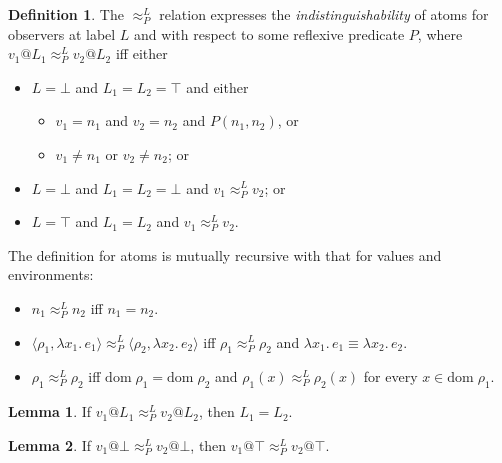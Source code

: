 \documentclass{article}
\makeatletter
\newcommand{\at}{\ensuremath{{\scriptstyle{@}}}}
\theoremstyle{definition}
\newtheorem{lemma}{Lemma}
\newtheorem{definition}{Definition}
\makeatother
\begin{document}
\begin{definition}
  The $\approx^{L}_{P}$ relation expresses the \emph{indistinguishability} of
  atoms for observers at label $L$ and with respect to some reflexive predicate
  $P$, where $v_1 \at L_1 \approx^{L}_{P} v_2 \at L_2$ iff either
  \begin{itemize}
  \item $L = \bot$ and
    $L_1 = L_2 = \top$ and either
    \begin{itemize}
    \item $v_1 = n_1$ and
      $v_2 = n_2$ and
      $P(n_1, n_2)$, or
    \item $v_1 \not= n_1$ or $v_2 \not= n_2$; or
    \end{itemize}
  \item $L = \bot$ and
    $L_1 = L_2 = \bot$ and $v_1 \approx^{L}_{P} v_2$; or
  \item $L = \top$ and $L_1 = L_2$ and $v_1 \approx^{L}_{P} v_2$.
  \end{itemize}
  The definition for atoms is mutually recursive with that for values and
  environments:
  \begin{itemize}
  \item $n_1 \approx^{L}_{P} n_2$ iff $n_1 = n_2$.
  \item
    $\langle{\rho_1, \lambda{x_1}.\, e_1\rangle} \approx^{L}_{P}
    \langle{\rho_2, \lambda{x_2}.\, e_2\rangle}$ iff
    $\rho_1 \approx^{L}_{P} \rho_2$ and
    $\lambda{x_1}.\, e_1 \equiv \lambda{x_2}.\, e_2$.
  \item $\rho_1 \approx^{L}_{P} \rho_2$ iff
    $\mathrm{dom}\; \rho_1 = \mathrm{dom}\; \rho_2$ and
    $\rho_1(x) \approx^{L}_{P} \rho_2(x)$ for every
    $x \in \mathrm{dom}\; \rho_1$.
  \end{itemize}
  \label{def:indistinguishability}
\end{definition}

\begin{lemma}
  If $v_1 \at L_1 \approx^{L}_{P} v_2 \at L_2$, then $L_1 = L_2$.
  \label{lem:lab-inversion}
\end{lemma}

\begin{lemma}
  If $v_1 \at \bot \approx^{L}_{P} v_2 \at \bot$, then
  $v_1 \at \top \approx^{L}_{P} v_2 \at \top$.
\end{lemma}
\end{document}
